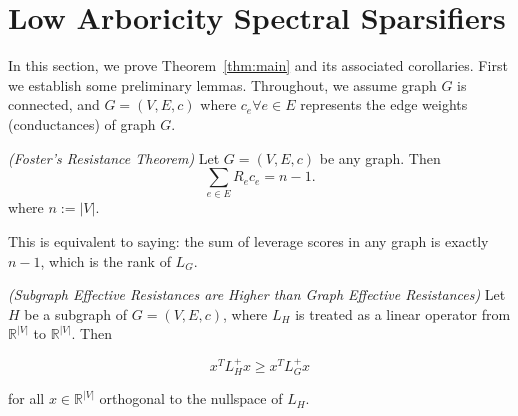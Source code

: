 \section{Low Arboricity Spectral Sparsifiers}\label{sec:main}

In this section, we prove Theorem~\ref{thm:main} and its associated
corollaries. First we establish some preliminary lemmas. Throughout, we assume graph
$G$ is connected, and $G = (V, E, c)$ where $c_e \forall e \in E$
represents the edge weights (conductances) of graph $G$. 
\begin{lemma} \label{foster}
\textit{(Foster's Resistance Theorem)} Let $G = (V, E, c)$ be any graph. Then 
\begin{equation}
\sum_{e \in E} R_ec_e = n-1.
\end{equation}
where $n:=|V|$. 
\end{lemma}
This is equivalent to saying: the sum of leverage scores in any graph is
exactly $n-1$, which is the rank of $L_G$.

\begin{lemma} \label{lem:monotone}
\textit{(Subgraph Effective Resistances are Higher than Graph Effective
    Resistances)} Let $H$ be a subgraph of $G = (V, E, c)$, where $L_H$ is treated as a linear operator from $\mathbb{R}^{|V|}$ to $\mathbb{R}^{|V|}$. Then

\begin{equation}\label{lem} 
x^T L_H^+ x \geq x^T L_G^+ x
\end{equation}

for all $x \in \mathbb{R}^{|V|}$ orthogonal to the nullspace of $L_H$. 

\end{lemma}


